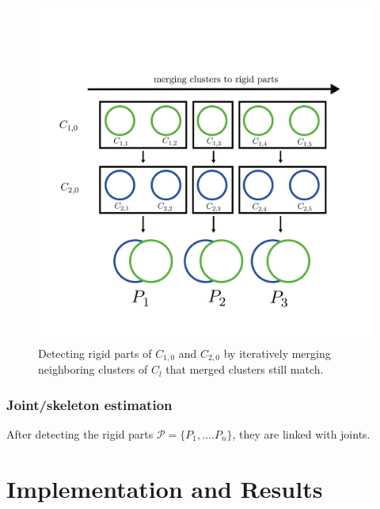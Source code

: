 \documentclass[notitlepage,english]{hgbreport}
\begin{document}
	\begin{figure}
		\centering
		\includegraphics[width=0.7\linewidth]{ClusterChain}
		\caption{Detecting rigid parts of $C_{1,0}$ and $C_{2,0}$ by iteratively merging neighboring clusters of $C_l$ that merged clusters still match.}
		\label{fig:clusterChain}
	\end{figure}
	
	\subsection{Joint/skeleton estimation}
	
	After detecting the rigid parts $\mathcal{P} =  \{ {P_1,....P_n}\}$, they are linked with joints.
	
	\chapter{Implementation and Results}
	
\end{document}
